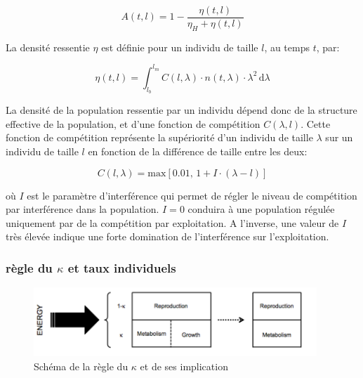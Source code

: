 \begin{equation}
\label{eq_an1}
A(t,l)=1-\frac{\eta(t,l)}{\eta_H+\eta(t,l) }  
\end{equation}

La densité ressentie $\eta$ est définie pour un individu de taille $l$, au temps
$t$, par:

\begin{equation}
\label{eq_an2}
\eta(t,l)=\int_{l_b}^{l_m} \! C(l,\lambda)\cdot n(t,\lambda)\cdot\lambda^2\, \mathrm{d}\lambda
\end{equation}

La densité de la population ressentie par un individu dépend donc de la
structure effective de la population, et d'une fonction de compétition $C(\lambda ,l)$.
Cette fonction de compétition représente la supériorité d'un individu de taille
$\lambda$ sur un individu de taille $l$ en fonction de la différence de taille
entre les deux:

\begin{equation}
\label{eq_an3}
C(l,\lambda) = \mathrm{max}\left[ 0.01,\, 1+I\cdot(\lambda-l) \right]
\end{equation}

où $I$ est le paramètre d'interférence qui permet de régler le niveau de
compétition par interférence dans la population. $I=0$ conduira à une population
régulée uniquement par de la compétition par exploitation. A l'inverse, une
valeur de $I$ très élevée indique une forte domination de l'interférence sur
l'exploitation.

\subsubsection{règle du $\kappa$ et taux individuels}

\begin{figure}[!ht]
\begin{center}
\includegraphics[width=0.95\textwidth]{1_CorpsDeThese/Resumes/Fig/AN01}
\caption[Règle du
$\kappa$]{Schéma de la règle du $\kappa$ et de ses implication}
\label{fig:AN1}
\end{center}
\end{figure}

